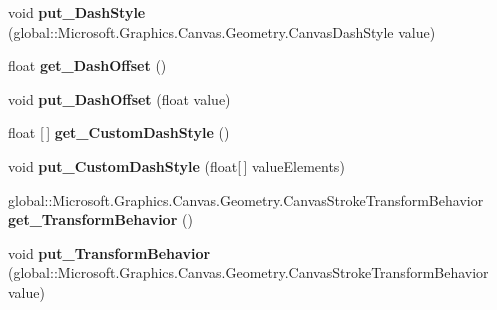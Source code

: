 \begin{DoxyCompactItemize}
void {\bfseries put\+\_\+\+Dash\+Style} (global\+::\+Microsoft.\+Graphics.\+Canvas.\+Geometry.\+Canvas\+Dash\+Style value)
\item 
\mbox{\label{interface_microsoft_1_1_graphics_1_1_canvas_1_1_geometry_1_1_i_canvas_stroke_style_a261cdb6c0132a1ce93c7ecd652c1956d}} 
float {\bfseries get\+\_\+\+Dash\+Offset} ()
\item 
\mbox{\label{interface_microsoft_1_1_graphics_1_1_canvas_1_1_geometry_1_1_i_canvas_stroke_style_a470c5f115b6bf096380d61e538a59cad}} 
void {\bfseries put\+\_\+\+Dash\+Offset} (float value)
\item 
\mbox{\label{interface_microsoft_1_1_graphics_1_1_canvas_1_1_geometry_1_1_i_canvas_stroke_style_a01ec98472128934fc496593cee96dff2}} 
float \mbox{[}$\,$\mbox{]} {\bfseries get\+\_\+\+Custom\+Dash\+Style} ()
\item 
\mbox{\label{interface_microsoft_1_1_graphics_1_1_canvas_1_1_geometry_1_1_i_canvas_stroke_style_afc2f9171bd8e3a6ef7927abcbd756c59}} 
void {\bfseries put\+\_\+\+Custom\+Dash\+Style} (float\mbox{[}$\,$\mbox{]} value\+Elements)
\item 
\mbox{\label{interface_microsoft_1_1_graphics_1_1_canvas_1_1_geometry_1_1_i_canvas_stroke_style_a8c19df45244410757192563987bfbdfa}} 
global\+::\+Microsoft.\+Graphics.\+Canvas.\+Geometry.\+Canvas\+Stroke\+Transform\+Behavior {\bfseries get\+\_\+\+Transform\+Behavior} ()
\item 
\mbox{\label{interface_microsoft_1_1_graphics_1_1_canvas_1_1_geometry_1_1_i_canvas_stroke_style_ac482e23f3ef5eebc025715899d1deb51}} 
void {\bfseries put\+\_\+\+Transform\+Behavior} (global\+::\+Microsoft.\+Graphics.\+Canvas.\+Geometry.\+Canvas\+Stroke\+Transform\+Behavior value)
\item 
\mbox{\label{interface_microsoft_1_1_graphics_1_1_canvas_1_1_geometry_1_1_i_canvas_stroke_style_a23f30b5c717e10b15ce38fa7d3721e03}} 

\end{DoxyCompactItemize}
